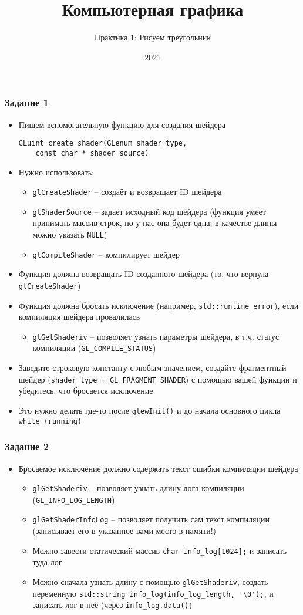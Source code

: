 \documentclass{beamer}
\title{Компьютерная графика}
\subtitle{Практика 1: Рисуем треугольник}
\date{2021}
\begin{document}
\frame{\titlepage}

\begin{frame}[fragile]
\frametitle{Задание 1}
\fontsize{8pt}{8pt}\selectfont
\begin{itemize}
\item Пишем вспомогательную функцию для создания шейдера
\begin{verbatim}
GLuint create_shader(GLenum shader_type,
    const char * shader_source)
\end{verbatim}
\pause
\item Нужно использовать:
\begin{itemize}
\item \verb|glCreateShader| -- создаёт и возвращает ID шейдера
\item \verb|glShaderSource| -- задаёт исходный код шейдера (функция умеет принимать массив строк, но у нас она будет одна; в качестве длины можно указать \verb|NULL|)
\item \verb|glCompileShader| -- компилирует шейдер
\end{itemize}
\pause
\item Функция должна возвращать ID созданного шейдера (то, что вернула \verb|glCreateShader|)
\pause
\item Функция должна бросать исключение (например, \verb|std::runtime_error|), если компиляция шейдера провалилась
\begin{itemize}
\item \verb|glGetShaderiv| -- позволяет узнать параметры шейдера, в т.ч. статус компиляции (\verb|GL_COMPILE_STATUS|)
\end{itemize}
\pause
\item Заведите строковую константу с любым значением, создайте фрагментный шейдер (\verb|shader_type = GL_FRAGMENT_SHADER|) с помощью вашей функции и убедитесь, что бросается исключение
\item Это нужно делать где-то после \verb|glewInit()| и до начала основного цикла \verb|while (running)|
\end{itemize}
\end{frame}

\begin{frame}[fragile]
\frametitle{Задание 2}
\begin{itemize}
\item Бросаемое исключение должно содержать текст ошибки компиляции шейдера
\pause
\begin{itemize}
\item \verb|glGetShaderiv| -- позволяет узнать длину лога компиляции (\verb|GL_INFO_LOG_LENGTH|)
\item \verb|glGetShaderInfoLog| -- позволяет получить сам текст компиляции (записывает его в указанное вами место в памяти!)
\item Можно завести статический массив \verb|char info_log[1024];| и записать туда лог
\item Можно сначала узнать длину с помощью \verb|glGetShaderiv|, создать переменную \verb|std::string info_log(info_log_length, '\0');|, и записать лог в неё (через \verb|info_log.data()|)
\end{itemize}
\end{itemize}
\end{frame}
\end{document}
